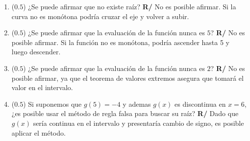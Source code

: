 \documentclass[12pt]{article}
\begin{document}
\begin{enumerate}[leftmargin=*,widest=9]
\begin{enumerate}[label=\alph*]
    \item (\(0.5\)) ¿Se puede afirmar que no existe raíz?
    \textbf{R/} No es posible afirmar. Si la curva no es monótona podría cruzar el eje y volver a subir.
\item (\(0.5\)) ¿Se puede afirmar que la evaluación de la función nunca es \(5\)?
\textbf{R/} No es posible afirmar. Si la función no es monótona, podría ascender hasta 5 y luego descender.
\item (\(0.5\)) ¿Se puede afirmar que la evaluación de la función nunca es \(2\)?
\textbf{R/} No es posible afirmar, ya que el teorema de valores extremos asegura que tomará el valor en el intervalo.
\item (\(0.5\)) Si suponemos que \(g(5)=-4\) y ademas \(g(x)\) es discontinua en \(x=6\), ¿es posible usar el método de regla falsa para buscar su raíz?
\textbf{R/} Dado que \(g(x) \) sería continua en el intervalo y presentaría cambio de signo, es posible aplicar el método.
  \end{enumerate}
\end{enumerate}
\end{document}
